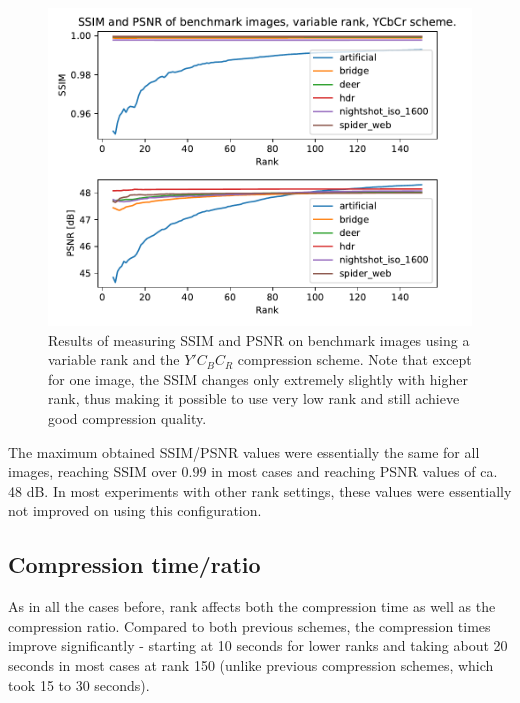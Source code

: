 \documentclass[thesis=M,english]{FITthesis}[2012/10/20]
\begin{document}
\begin{figure}[h]
  \centering
  \includegraphics[scale=0.7]{imgs/results/psnr_ssim_ycbcr}
  \caption[SSIM and PSNR using $Y'C_BC_R$ compression scheme]{Results of measuring SSIM and PSNR
           on benchmark images using a variable rank
           and the $Y'C_BC_R$ compression scheme.
  		  Note that except for one image, the SSIM changes only extremely slightly
  		  with higher rank, thus making it possible to use very low rank and still
  		  achieve good compression quality.}
  \label{fig:ssim_ycbcr}
\end{figure}

The maximum obtained SSIM/PSNR values were essentially the same for all images, reaching
SSIM over $0.99$ in most cases and reaching PSNR values of ca. 48 dB. In most experiments
with other rank settings, these values were essentially not improved on using this configuration. 

\subsection{Compression time/ratio}
As in all the cases before, rank affects both the compression time as well as the compression ratio.
Compared to both previous schemes, the compression times improve significantly - starting at
10 seconds for lower ranks and taking about 20 seconds in most cases at rank 150 (unlike
previous compression schemes, which took 15 to 30 seconds).
\end{document}
